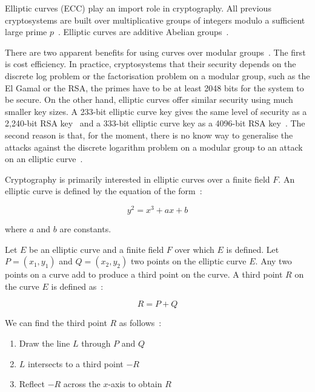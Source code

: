 Elliptic curves (ECC) play an import role in cryptography. All previous cryptosystems are built over multiplicative groups of integers modulo a sufficient large prime $p$~\cite{kiagias:crypto, boneh_crypto}. Elliptic curves are additive Abelian groups~\cite{kiagias:crypto}.

There are two apparent benefits for using curves over modular groups~\cite{kiagias:crypto}. The first is cost efficiency. In practice, cryptosystems that their security depends on the discrete log problem or the factorisation problem on a modular group, such as the El Gamal or the RSA, the primes have to be at least 2048 bits for the system to be secure. On the other hand, elliptic curves offer similar security using much smaller key sizes. A 233-bit elliptic curve key gives the same level of security as a 2,240-bit RSA key~\cite{ecc_rsa_bits, ecc_rsa_bits_1} and a 333-bit elliptic curve key as a 4096-bit RSA key~\cite{blake1999elliptic}. The second reason is that, for the moment, there is no know way to generalise the attacks against the discrete logarithm problem on a modular group to an attack on an elliptic curve~\cite{kiagias:crypto}.

Cryptography is primarily interested in elliptic curves over a finite field $F$. An elliptic curve is defined by the equation of the form~\cite{elliptic_curves}:

\begin{equation*}
  y^2 = x^3 + ax + b
\end{equation*}

where $a$ and $b$ are constants.

Let $E$ be an elliptic curve and a finite field $F$ over which $E$ is defined. Let $P = (x_1, y_1)$ and $Q = (x_2, y_2)$ two points on the elliptic curve $E$. Any two points on a curve add to produce a third point on the curve. A third point $R$ on the curve $E$ is defined as~\cite{elliptic_curves}:

\begin{equation*}
  R = P + Q
\end{equation*}

We can find the third point $R$ as follows~\cite{elliptic_curves}:

\begin{enumerate}
  \item Draw the line $L$ through $P$ and $Q$
  \item $L$ intersects to a third point $-R$
  \item Reflect $-R$ across the $x$-axis to obtain $R$
\end{enumerate}

